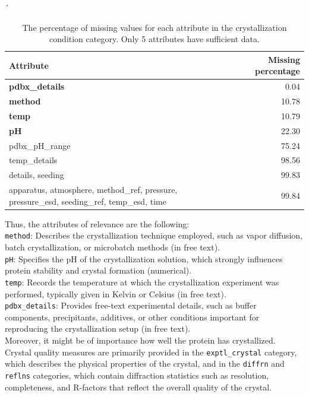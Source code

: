 \begin{table}[h]
	´\centering
	\begin{tabularx}{\linewidth}{p{8cm}r}
		\toprule
		Attribute & Missing percentage \\
		\midrule
		\textbf{pdbx\_details} & 0.04 \\
		\textbf{method} & 10.78 \\
		\textbf{temp} & 10.79 \\
		\textbf{pH} & 22.30 \\
		pdbx\_pH\_range & 75.24 \\
		temp\_details & 98.56 \\
		details, seeding & 99.83 \\
		apparatus, atmosphere, method\_ref, pressure, pressure\_esd, seeding\_ref, temp\_esd, time & 99.84 \\
		\bottomrule
	\end{tabularx}
	\caption[Percentage of missing data per label attribute]{The percentage of missing values for each attribute in the crystallization condition category. Only 5 attributes have sufficient data. }
	\label{tab:missing_percentage}
\end{table}

Thus, the attributes of relevance are the following: \\
\texttt{method}: Describes the crystallization technique employed, such as vapor diffusion, batch crystallization, or microbatch methods (in free text).\\
\texttt{pH}: Specifies the pH of the crystallization solution, which strongly influences protein stability and crystal formation (numerical).\\
\texttt{temp}: Records the temperature at which the crystallization experiment was performed, typically given in Kelvin or Celsius (in free text).\\
\texttt{pdbx\_details}: Provides free-text experimental details, such as buffer components, precipitants, additives, or other conditions important for reproducing the crystallization setup (in free text).\\

Moreover, it might be of importance how well the protein has crystallized. Crystal quality measures are primarily provided in the \texttt{exptl\_crystal} category, which describes the physical properties of the crystal, and in the \texttt{diffrn} and \texttt{reflns} categories, which contain diffraction statistics such as resolution, completeness, and R-factors that reflect the overall quality of the crystal.

